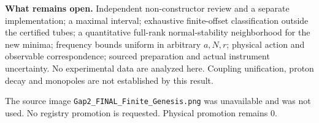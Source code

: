 \documentclass[11pt,a4paper]{article}
\begin{document}
\textbf{What remains open.} Independent non-constructor review and a separate implementation; a maximal interval; exhaustive finite-offset classification outside the certified tubes; a quantitative full-rank normal-stability neighborhood for the new minima; frequency bounds uniform in arbitrary $a,N,r$; physical action and observable correspondence; sourced preparation and actual instrument uncertainty. No experimental data are analyzed here. Coupling unification, proton decay and monopoles are not established by this result.

The source image \texttt{Gap2\_FINAL\_Finite\_Genesis.png} was unavailable and was not used. No registry promotion is requested. Physical promotion remains $0$.
\end{document}
